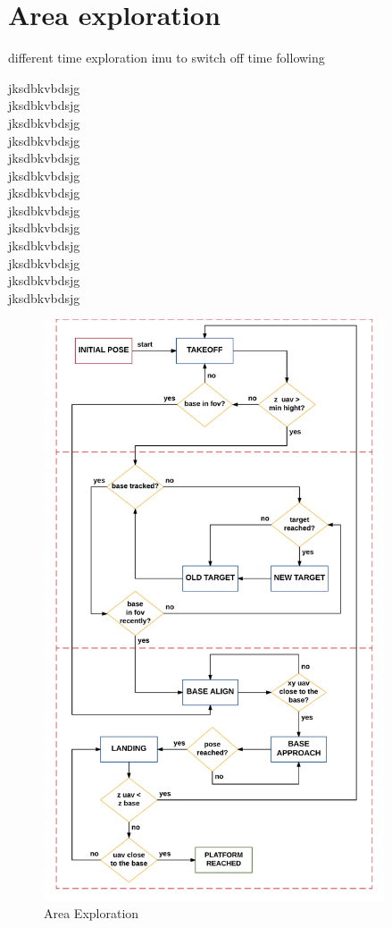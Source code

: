 \chapter{Area exploration}\label{chap:area_exploration}
different time exploration
imu to switch off
time following


jksdbkvbdsjg\\
 jksdbkvbdsjg\\
jksdbkvbdsjg\\
 jksdbkvbdsjg\\
jksdbkvbdsjg\\
 jksdbkvbdsjg\\
jksdbkvbdsjg\\
 jksdbkvbdsjg\\
jksdbkvbdsjg\\
 jksdbkvbdsjg\\
jksdbkvbdsjg\\
 jksdbkvbdsjg\\
jksdbkvbdsjg\\
\begin{figure}[!htbp]
    \centering
    \includegraphics[width=0.9\textwidth]{img/area_exploration_state_machine.png}
    \caption{Area Exploration}
    \label{fig:area_exploration_state_machine}
\end{figure}

